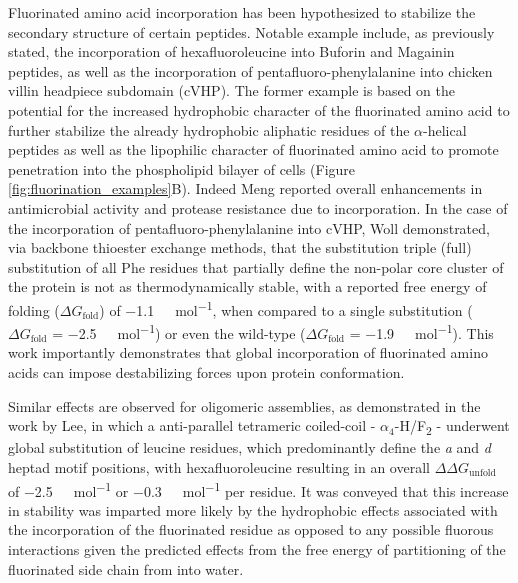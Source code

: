 \begin{refsection}
Fluorinated amino acid incorporation has been hypothesized to stabilize the
secondary structure of certain peptides. Notable example include, as previously
stated, the incorporation of hexafluoroleucine into Buforin and Magainin
peptides, as well as the incorporation of pentafluoro-phenylalanine into chicken
villin headpiece subdomain (cVHP).\cite{Meng2007,Woll2006} The former example is
based on the potential for the increased hydrophobic character of the
fluorinated amino acid to further stabilize the already hydrophobic aliphatic
residues of the ${\alpha}$-helical peptides as well as the lipophilic character
of fluorinated amino acid to promote penetration into the phospholipid bilayer
of cells (Figure \ref{fig:fluorination_examples}B).\cite{Meng2007} Indeed Meng
reported overall enhancements in antimicrobial activity and protease resistance
due to incorporation. In the case of the incorporation of
pentafluoro-phenylalanine into cVHP, Woll demonstrated, via backbone thioester
exchange methods, that the substitution triple (full) substitution of all Phe
residues that partially define the non-polar core cluster of the protein is not
as thermodynamically stable, with a reported free energy of folding (${\Delta
    G_{\text{fold}}}$) of \SI{-1.1}{\kilo\cal\per\mole}, when compared to a
    single substitution (${\Delta G_{\text{fold}}}$ =
    \SI{-2.5}{\kilo\cal\per\mole}) or even the wild-type (${\Delta
        G_{\text{fold}}}$ = \SI{-1.9}{\kilo\cal\per\mole}).\cite{Woll2006} This
        work importantly demonstrates that global incorporation of fluorinated
        amino acids can impose destabilizing forces upon protein conformation.

Similar effects are observed for oligomeric assemblies, as demonstrated in the
work by Lee, in which a  anti-parallel tetrameric coiled-coil -
${\alpha_{4}}$-H/F\textsubscript{2} - underwent global substitution of
leucine residues, which predominantly define the \emph{a} and \emph{d} heptad
motif positions, with hexafluoroleucine resulting in an overall ${\Delta \Delta
    G_{\text{unfold}}}$ of \SI{-2.5}{\kilo\cal\per\mole} or
    \SI{-0.3}{\kilo\cal\per\mole} per residue.\cite{Lee2004} It was conveyed
    that this increase in stability
    was imparted more likely by the hydrophobic effects associated with the
    incorporation of the fluorinated residue as opposed to any possible fluorous
    interactions given the predicted effects from the free energy of
    partitioning of the fluorinated side chain from  into
    water.


\end{refsection}
